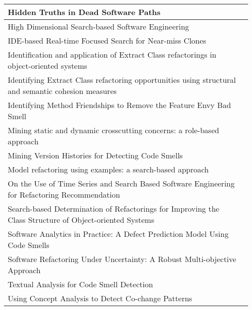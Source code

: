 \documentclass[preprint,review,12pt]{elsarticle}
\begin{document}
\begin{longtable}{|p{}|p{}|}
Hidden Truths in Dead Software Paths                                                                   & \cite{Eichberg2015}           \\ \hline
High Dimensional Search-based Software Engineering                                                     & \cite{Mkaouer2014}            \\ \hline
IDE-based Real-time Focused Search for Near-miss Clones                                                & \cite{Zibran2012}             \\ \hline
Identification and application of Extract Class refactorings in object-oriented systems                & \cite{Fokaefs2012}            \\ \hline
Identifying Extract Class refactoring opportunities using structural and semantic cohesion measures    & \cite{bavota2011}             \\ \hline
Identifying Method Friendships to Remove the Feature Envy Bad Smell                                    & \cite{Oliveto2011}            \\ \hline
Mining static and dynamic crosscutting concerns: a role-based approach                                 & \cite{Bernardi2016}           \\ \hline
Mining Version Histories for Detecting Code Smells                                                     & \cite{Palomba2015Mining}      \\ \hline
Model refactoring using examples: a search-based approach                                              & \cite{granhem2014model}       \\ \hline
On the Use of Time Series and Search Based Software Engineering for Refactoring Recommendation         & \cite{Wang2015}               \\ \hline
Search-based Determination of Refactorings for Improving the Class Structure of Object-oriented Systems& \cite{seng2006search}         \\ \hline
Software Analytics in Practice: A Defect Prediction Model Using Code Smells                            & \cite{Soltanifar2016}         \\ \hline
Software Refactoring Under Uncertainty: A Robust Multi-objective Approach                              & \cite{mkaouer2014refactoring} \\ \hline
Textual Analysis for Code Smell Detection                                                              & \cite{Palomba2015Textual}     \\ \hline
Using Concept Analysis to Detect Co-change Patterns                                                    & \cite{girba2007} \\ \hline         
\end{longtable}
\end{document}

